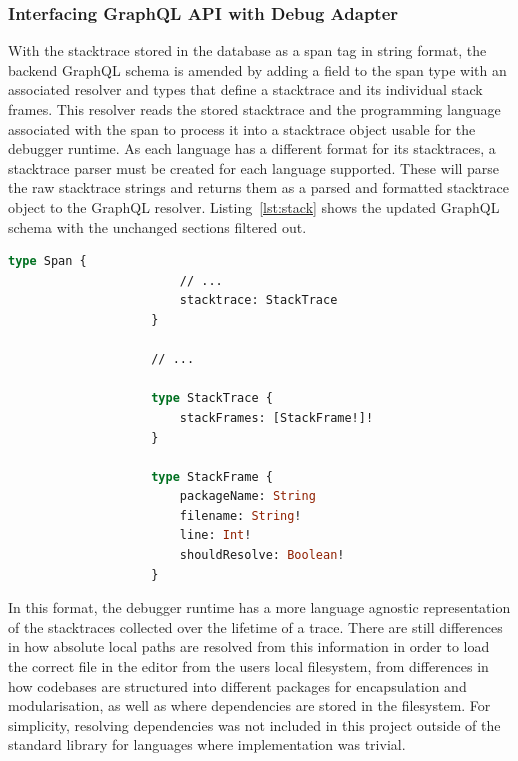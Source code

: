 \documentclass[12pt,pdftex,titlepage]{report}
\begin{document}
                \subsubsection{Interfacing GraphQL API with Debug Adapter}
                    With the stacktrace stored in the database as a span tag in string format, the backend GraphQL schema is amended by adding a field to the span type with an associated resolver and 
                    types that define a stacktrace and its individual stack frames. This resolver reads the stored stacktrace and the programming language associated with the span to process it into a 
                    stacktrace object usable for the debugger runtime. As each language has a different format for its stacktraces, a stacktrace parser must be created for each language supported. These
                    will parse the raw stacktrace strings and returns them as a parsed and formatted stacktrace object to the GraphQL resolver. Listing~\ref{lst:stack} shows the updated GraphQL schema
                    with the unchanged sections filtered out. 

                \bigskip
                \begin{lstlisting}[caption={GraphQL schema updated with stack- trace and frame objects. Unchanged fields and objects filtered. The \texttt{shouldReslolve} field indicates
                    whether a file path requires additional resolving in the debugger runtime.}, language=GraphQL, gobble=20, label={lst:stack}]
                    type Span {
                        // ...
                        stacktrace: StackTrace
                    }

                    // ...

                    type StackTrace {
                        stackFrames: [StackFrame!]!
                    }

                    type StackFrame {
                        packageName: String
                        filename: String!
                        line: Int!
                        shouldResolve: Boolean!
                    }
                \end{lstlisting}
                \bigskip

                In this format, the debugger runtime has a more language agnostic representation of the stacktraces collected over the lifetime of a trace. There are still differences
                in how absolute local paths are resolved from this information in order to load the correct file in the editor from the users local filesystem, from differences in how
                codebases are structured into different packages for encapsulation and modularisation, as well as where dependencies are stored in the filesystem. For simplicity, 
                resolving dependencies was not included in this project outside of the standard library for languages where implementation was trivial.
\end{document}
